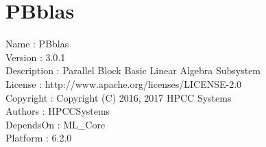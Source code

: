 \chapter*{PBblas}
\hypertarget{ecldoc:toc:PBblas}{}

Name : PBblas \\
Version : 3.0.1 \\
Description : Parallel Block Basic Linear Algebra Subsystem \\
License : http://www.apache.org/licenses/LICENSE-2.0 \\
Copyright : Copyright (C) 2016, 2017 HPCC Systems \\
Authors : HPCCSystems \\
DependsOn : ML\_Core \\
Platform : 6.2.0 \\

